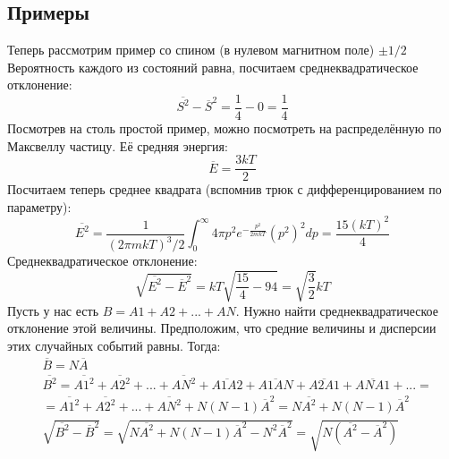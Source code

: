 \documentclass[a4paper, 12pt]{article}
\begin{document}
	\subsection{Примеры}
	Теперь рассмотрим пример со спином (в нулевом магнитном поле) $\pm 1/2$
	Вероятность каждого из состояний равна, посчитаем среднеквадратическое отклонение:
	\begin{equation*}
		\overline{S^{2}} - \overline{S}^{2} = 	\frac{1}{4} - 0 = 	\frac{1}{4} 
	\end{equation*}
	Посмотрев на столь простой пример, можно посмотреть на распределённую по Максвеллу частицу. Её средняя энергия:
	\begin{equation*}
		\overline{E} = \frac{3kT}{2}
	\end{equation*}
	Посчитаем теперь среднее квадрата (вспомнив трюк с дифференцированием по параметру):
	\begin{equation*}
		\overline{E^{2}} = \frac{1}{(2 \pi mkT)^3/2} \int_0^{\infty} 4 \pi p^{2} e^{-\frac{p^2}{2mkT}} (p^{2})^{2} dp = \frac{15 (kT)^{2}}{4}
	\end{equation*}
	Среднеквадратическое отклонение:
	\begin{equation*}
		\sqrt{\overline{E^{2}} - \overline{E}^{2} } = kT \sqrt{\frac{15}{4} - {9}{4}} = \sqrt{\frac{3}{2}} kT
	\end{equation*}
	Пусть у нас есть $B = A1 + A2 + ... + AN$. Нужно найти среднеквадратическое отклонение этой величины. Предположим, что средние величины и дисперсии этих случайных событий равны. Тогда:
	\begin{equation*}
		\begin{aligned}
			& \overline{B} = N \overline{A}                                                                                                                                             \\
			& \overline{B^{2}} = \overline{A1^{2} }+ \overline{A2^{2}} + ... + \overline{AN^{2}} + \overline{A1A2} + \overline{A1AN} + \overline{A2A1} + \overline{ANA1} + ... =        \\
			& =  \overline{A1^{2} }+ \overline{A2^{2}} + ... + \overline{AN^{2}} +N(N-1)\overline{A}^{2} = N  \overline{A^{2} } +N(N-1)\overline{A}^{2}                                 \\
			& \sqrt{ \overline{B^2} - \overline{B}^2 } =\sqrt{N  \overline{A^{2} } +N(N-1)\overline{A}^{2} - N^{2}\overline{A}^{2}  } = \sqrt {N (\overline{A^{2} }- \overline{A}^{2})} \\
		\end{aligned}
	\end{equation*}
\end{document}
